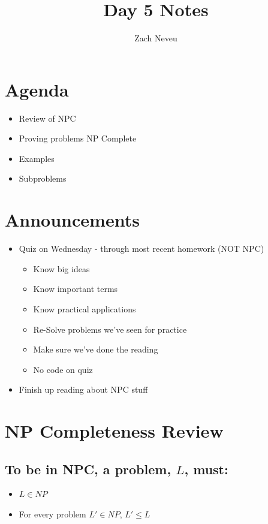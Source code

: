 \documentclass[12pt, letter]{article}
\author{Zach Neveu}
\title{ Day 5 Notes }
\begin{document}
\maketitle

\section{Agenda}%
\label{sec:agenda}
\begin{itemize}
	\item Review of NPC
	\item Proving problems NP Complete
	\item Examples
	\item Subproblems
\end{itemize}

\section{Announcements}%
\label{sec:announcements}
\begin{itemize}
	\item Quiz on Wednesday - through most recent homework (NOT NPC)
	\begin{itemize}
		\item Know big ideas
		\item Know important terms
		\item Know practical applications
		\item Re-Solve problems we've seen for practice
		\item Make sure we've done the reading
		\item No code on quiz
	\end{itemize}
	\item Finish up reading about NPC stuff
\end{itemize}

\section{NP Completeness Review}%
\label{sec:np_completeness_review}

\subsection*{To be in NPC, a problem, $L$, must:}
\begin{itemize}
	\item $L \in NP$
	\item For every problem $L' \in NP$, $L' \le L$
\end{itemize}
\end{document}
